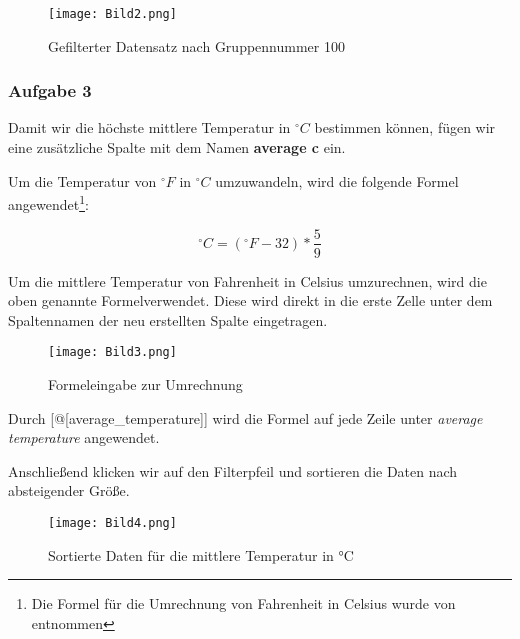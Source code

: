 \documentclass[a4paper, 12pt]{article}
\begin{document}
\vspace{\baselineskip}

\begin{figure}[ht]
    \centering
    \texttt{[image: Bild2.png]}
    \par Gefilterter Datensatz nach Gruppennummer 100
\end{figure}

\newpage

\subsubsection{Aufgabe 3}
Damit wir die höchste mittlere Temperatur in  \(^\circ C\) bestimmen können, fügen wir eine zusätzliche Spalte mit dem Namen \textbf{average c} ein.

Um die Temperatur von \(^\circ F\) in \(^\circ C\) umzuwandeln, wird die folgende Formel angewendet\footnote{Die Formel für die Umrechnung von Fahrenheit in Celsius wurde von \cite{2} entnommen}:

\begin{equation}
   ^\circ C = (^\circ F -32 )*\frac{5}{9} \label{Grad}
\end{equation}

\vspace{\baselineskip}

Um die mittlere Temperatur von Fahrenheit in Celsius umzurechnen, wird die oben genannte Formelverwendet. Diese wird direkt in die erste Zelle unter dem Spaltennamen der neu erstellten Spalte eingetragen.

\vspace{\baselineskip}

\begin{figure}[ht]
    \centering
    \texttt{[image: Bild3.png]}
    \par Formeleingabe zur Umrechnung
\end{figure}

\vspace{\baselineskip}

Durch [@[average\_temperature]] wird die Formel auf jede Zeile unter \textit{average temperature} angewendet.

Anschließend klicken wir auf den Filterpfeil und sortieren die Daten nach absteigender Größe.

\vspace{\baselineskip}

\begin{figure}[ht]
    \centering
    \texttt{[image: Bild4.png]}
    \par Sortierte Daten für die mittlere Temperatur in °C
\end{figure}
\end{document}
